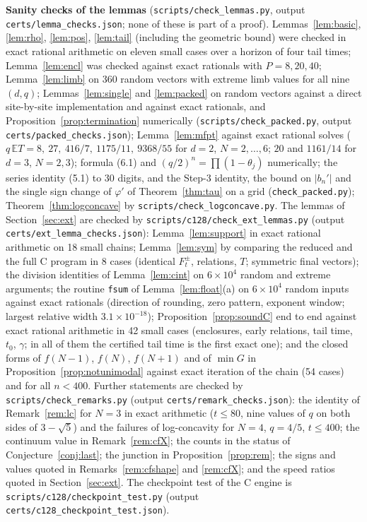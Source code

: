\documentclass[11pt,a4paper]{article}
\theoremstyle{definition}
\theoremstyle{remark}
\begin{document}
\textbf{Sanity checks of the lemmas} (\texttt{scripts/check\_lemmas.py}, output \texttt{certs/lemma\_checks.json}; none of these is part of a proof). Lemmas~\ref{lem:basic}, \ref{lem:rho}, \ref{lem:pos}, \ref{lem:tail} (including the geometric bound) were checked in exact rational arithmetic on eleven small cases over a horizon of four tail times; Lemma~\ref{lem:encl} was checked against exact rationals with $P=8,20,40$; Lemma~\ref{lem:limb} on 360 random vectors with extreme limb values for all nine $(d,q)$; Lemmas~\ref{lem:single} and \ref{lem:packed} on random vectors against a direct site-by-site implementation and against exact rationals, and Proposition~\ref{prop:termination} numerically (\texttt{scripts/check\_packed.py}, output \texttt{certs/packed\_checks.json}); Lemma~\ref{lem:mfpt} against exact rational solves ($q\,\mathbb E T=8,\ 27,\ 416/7,\ 1175/11,\ 9368/55$ for $d=2$, $N=2,\dots,6$; $20$ and $1161/14$ for $d=3$, $N=2,3$); formula (6.1) and $(q/2)^n=\prod(1-\theta_j)$ numerically; the series identity (5.1) to $30$ digits, and the Step-3 identity, the bound on $|b_n'|$ and the single sign change of $\varphi'$ of Theorem~\ref{thm:tau} on a grid (\texttt{check\_packed.py}); Theorem~\ref{thm:logconcave} by \texttt{scripts/check\_logconcave.py}. The lemmas of Section~\ref{sec:ext} are checked by \texttt{scripts/c128/check\_ext\_lemmas.py} (output \texttt{certs/ext\_lemma\_checks.json}): Lemma~\ref{lem:support} in exact rational arithmetic on 18 small chains; Lemma~\ref{lem:sym} by comparing the reduced and the full C program in 8 cases (identical $F^\pm_t$, relations, $T$; symmetric final vectors); the division identities of Lemma~\ref{lem:cint} on $6\times10^4$ random and extreme arguments; the routine \texttt{fsum} of Lemma~\ref{lem:float}(a) on $6\times10^4$ random inputs against exact rationals (direction of rounding, zero pattern, exponent window; largest relative width $3.1\times10^{-18}$); Proposition~\ref{prop:soundC} end to end against exact rational arithmetic in 42 small cases (enclosures, early relations, tail time, $t_0$, $\gamma$; in all of them the certified tail time is the first exact one); and the closed forms of $f(N-1)$, $f(N)$, $f(N+1)$ and of $\min G$ in Proposition~\ref{prop:notunimodal} against exact iteration of the chain (54 cases) and for all $n<400$. Further statements are checked by \texttt{scripts/check\_remarks.py} (output \texttt{certs/remark\_checks.json}): the identity of Remark~\ref{rem:lc} for $N=3$ in exact arithmetic ($t\le80$, nine values of $q$ on both sides of $3-\sqrt5$) and the failures of log-concavity for $N=4$, $q=4/5$, $t\le400$; the continuum value in Remark~\ref{rem:cfX}; the counts in the status of Conjecture~\ref{conj:last}; the junction in Proposition~\ref{prop:rem}; the signs and values quoted in Remarks~\ref{rem:cfshape} and \ref{rem:cfX}; and the speed ratios quoted in Section~\ref{sec:ext}. The checkpoint test of the C engine is \texttt{scripts/c128/checkpoint\_test.py} (output \texttt{certs/c128\_checkpoint\_test.json}).
\end{document}
